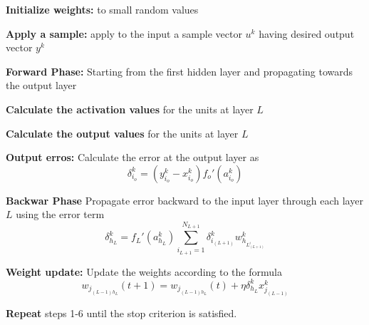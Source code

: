 \documentclass[12pt, a4paper, twoside]{book}
\begin{document}
\begin{steps}
    \item  \textbf{Initialize weights:} to small random values
    \item  \textbf{Apply a sample:} apply to the input a sample vector $u^k$ having desired output vector $y^k$
    \item  \textbf{Forward Phase:} Starting from the first hidden layer and propagating towards the output layer
    \begin{steps}
        \item \textbf{Calculate the activation values} for the units at layer $L$
        \item \textbf{Calculate the output values} for the units at layer $L$
    \end{steps} 
    \item \textbf{Output erros:} Calculate the error at the output layer as
    \[\delta_{i_o}^k = (y_{i_o}^k - x_{i_o}^k)f_o'(a_{i_o}^k)\]
    \item \textbf{Backwar Phase} Propagate error backward to the input layer through each layer $L$ using the error term
    \[\delta_{h_L}^k = f_L'(a_{h_L}^k)\sum_{i_{L+1}=1}^{N_{L+1}}\delta_{i_{(L+1)}}^k w_{h_{L_{(L+1)}^i}}^k\]
    \item \textbf{Weight update:} Update the weights according to the formula
    \[w_{j_{(L-1)h_L}}(t+1) = w_{j_{(L-1)h_L}}(t) +\eta\delta_{h_L}^kx_{j_{(L-1)}}^k \] 
    \item \textbf{Repeat} steps 1-6 until the stop criterion is satisfied.
\end{steps}
\end{document}
